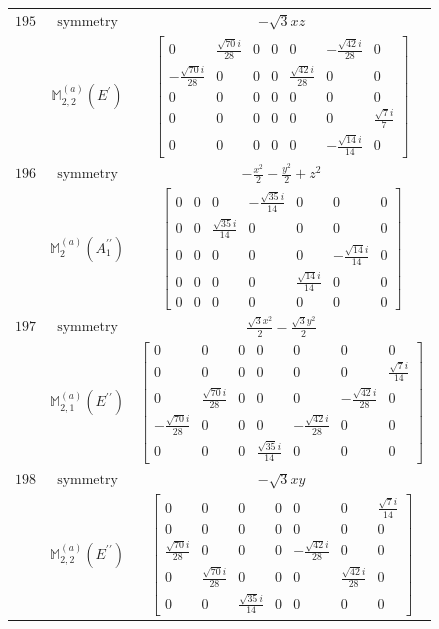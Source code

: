 \documentclass[fleqn,8pt,landscape]{jsarticle}
\begin{document}
\begin{longtable}{ccc}
$ 195 $ & $ \text{symmetry} $ & $ - \sqrt{3} x z $ \\
$  $ & $ \mathbb{M}_{2,2}^{(a)}(E^{\prime}) $ & $ \begin{bmatrix} 0 & \frac{\sqrt{70} i}{28} & 0 & 0 & 0 & - \frac{\sqrt{42} i}{28} & 0 \\ - \frac{\sqrt{70} i}{28} & 0 & 0 & 0 & \frac{\sqrt{42} i}{28} & 0 & 0 \\ 0 & 0 & 0 & 0 & 0 & 0 & 0 \\ 0 & 0 & 0 & 0 & 0 & 0 & \frac{\sqrt{7} i}{7} \\ 0 & 0 & 0 & 0 & 0 & - \frac{\sqrt{14} i}{14} & 0 \end{bmatrix} $ \\ \hline
$ 196 $ & $ \text{symmetry} $ & $ - \frac{x^{2}}{2} - \frac{y^{2}}{2} + z^{2} $ \\
$  $ & $ \mathbb{M}_{2}^{(a)}(A_{1}^{\prime\prime}) $ & $ \begin{bmatrix} 0 & 0 & 0 & - \frac{\sqrt{35} i}{14} & 0 & 0 & 0 \\ 0 & 0 & \frac{\sqrt{35} i}{14} & 0 & 0 & 0 & 0 \\ 0 & 0 & 0 & 0 & 0 & - \frac{\sqrt{14} i}{14} & 0 \\ 0 & 0 & 0 & 0 & \frac{\sqrt{14} i}{14} & 0 & 0 \\ 0 & 0 & 0 & 0 & 0 & 0 & 0 \end{bmatrix} $ \\ \hline
$ 197 $ & $ \text{symmetry} $ & $ \frac{\sqrt{3} x^{2}}{2} - \frac{\sqrt{3} y^{2}}{2} $ \\
$  $ & $ \mathbb{M}_{2,1}^{(a)}(E^{\prime\prime}) $ & $ \begin{bmatrix} 0 & 0 & 0 & 0 & 0 & 0 & 0 \\ 0 & 0 & 0 & 0 & 0 & 0 & \frac{\sqrt{7} i}{14} \\ 0 & \frac{\sqrt{70} i}{28} & 0 & 0 & 0 & - \frac{\sqrt{42} i}{28} & 0 \\ - \frac{\sqrt{70} i}{28} & 0 & 0 & 0 & - \frac{\sqrt{42} i}{28} & 0 & 0 \\ 0 & 0 & 0 & \frac{\sqrt{35} i}{14} & 0 & 0 & 0 \end{bmatrix} $ \\ \hline
$ 198 $ & $ \text{symmetry} $ & $ - \sqrt{3} x y $ \\
$  $ & $ \mathbb{M}_{2,2}^{(a)}(E^{\prime\prime}) $ & $ \begin{bmatrix} 0 & 0 & 0 & 0 & 0 & 0 & \frac{\sqrt{7} i}{14} \\ 0 & 0 & 0 & 0 & 0 & 0 & 0 \\ \frac{\sqrt{70} i}{28} & 0 & 0 & 0 & - \frac{\sqrt{42} i}{28} & 0 & 0 \\ 0 & \frac{\sqrt{70} i}{28} & 0 & 0 & 0 & \frac{\sqrt{42} i}{28} & 0 \\ 0 & 0 & \frac{\sqrt{35} i}{14} & 0 & 0 & 0 & 0 \end{bmatrix} $ \\ \hline

\end{longtable}
\end{document}
